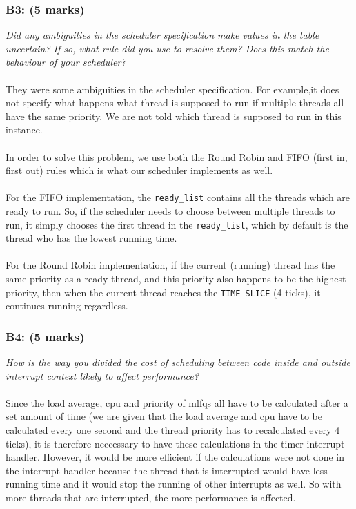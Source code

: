\documentclass{article}
\begin{document}
\subsubsection*{B3: (5 marks) }
\textit{Did any ambiguities in the scheduler specification make values in the table uncertain?  If so, what rule did you use to resolve them?  Does this match the behaviour of your scheduler?}
\\ \\
They were some ambiguities in the scheduler specification. For example,it does not specify what happens what thread is supposed to run if multiple threads all have the same priority. We are not told which thread is supposed to run in this instance.
  \\\\
In order to solve this problem, we use both the Round Robin and FIFO (first in, first out) rules which is what our scheduler implements as well.
  \\\\
For the FIFO implementation, the \texttt{ready\_list} contains all the threads which are ready to run. So, if the scheduler needs to choose between multiple threads to run, it simply chooses the first thread in the \texttt{ready\_list}, which by default is the thread who has the lowest running time.
  \\\\
For the Round Robin implementation, if the current (running) thread has the same priority as a ready thread, and this priority also happens to be the highest priority, then when the current thread reaches the \texttt{TIME\_SLICE} (4 ticks), it continues running regardless.

\subsubsection*{B4: (5 marks) }
\textit{How is the way you divided the cost of scheduling between code inside and outside interrupt context likely to affect performance?}
\\ \\
Since the load average, cpu and priority of mlfqs all have to be calculated after a set amount of time (we are given that the load average and cpu have to be calculated every one second and the thread priority has to recalculated every 4 ticks), it is therefore neccessary to have these calculations in the timer interrupt handler. However, it would be more efficient if the calculations were not done in the interrupt handler because the thread that is interrupted would have less running time and it would stop the running of other interrupts as well. So with more threads that are interrupted, the more performance is affected.
\end{document}
